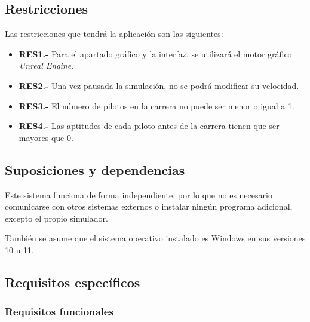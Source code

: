 \subsection{Restricciones}

Las restricciones que tendrá la aplicación son las siguientes:

\begin{itemize}
    \item \textbf{RES1.-} Para el apartado gráfico y la interfaz, se utilizará el motor gráfico \textit{Unreal Engine}.
    \item \textbf{RES2.-} Una vez pausada la simulación, no se podrá modificar su velocidad.
    \item \textbf{RES3.-} El número de pilotos en la carrera no puede ser menor o igual a 1.
    \item \textbf{RES4.-} Las aptitudes de cada piloto antes de la carrera tienen que ser mayores que 0.
\end{itemize}

\subsection{Suposiciones y dependencias}



Este sistema funciona de forma independiente, por lo que no es necesario comunicarse con otros sistemas externos o instalar ningún programa adicional, excepto el propio simulador.

\bigskip

También se asume que el sistema operativo instalado es Windows en sus versiones 10 u 11.

\subsection{Requisitos específicos}

\subsubsection{Requisitos funcionales}

